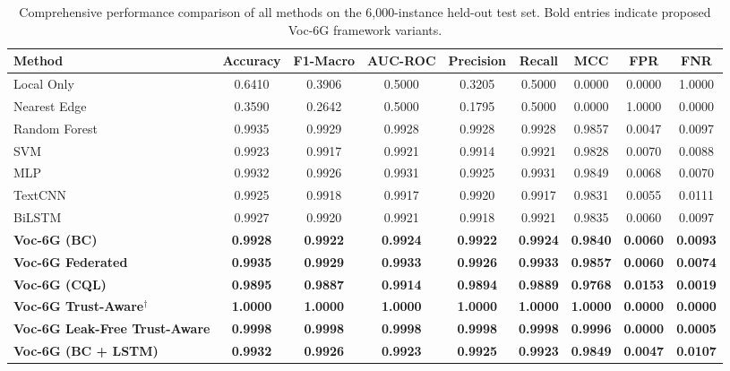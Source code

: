 \documentclass[journal,twoside]{IEEEtran}
\newcommand{\VocSixG}{Voc-6G}
\begin{document}
\begin{table}[t]
\caption{Comprehensive performance comparison of all methods on the 6,000-instance held-out test set. Bold entries indicate proposed \VocSixG{} framework variants.\footnotemark}
\label{tab:main_results}
\centering
\small
\begin{tabular}{lcccccccc}
\toprule
\textbf{Method} & \textbf{Accuracy} & \textbf{F1-Macro} & \textbf{AUC-ROC} & \textbf{Precision} & \textbf{Recall} & \textbf{MCC} & \textbf{FPR} & \textbf{FNR} \\
\midrule
Local Only       & 0.6410 & 0.3906 & 0.5000 & 0.3205 & 0.5000 & 0.0000 & 0.0000 & 1.0000 \\
Nearest Edge     & 0.3590 & 0.2642 & 0.5000 & 0.1795 & 0.5000 & 0.0000 & 1.0000 & 0.0000 \\
Random Forest    & 0.9935 & 0.9929 & 0.9928 & 0.9928 & 0.9928 & 0.9857 & 0.0047 & 0.0097 \\
SVM              & 0.9923 & 0.9917 & 0.9921 & 0.9914 & 0.9921 & 0.9828 & 0.0070 & 0.0088 \\
MLP              & 0.9932 & 0.9926 & 0.9931 & 0.9925 & 0.9931 & 0.9849 & 0.0068 & 0.0070 \\
TextCNN          & 0.9925 & 0.9918 & 0.9917 & 0.9920 & 0.9917 & 0.9831 & 0.0055 & 0.0111 \\
BiLSTM           & 0.9927 & 0.9920 & 0.9921 & 0.9918 & 0.9921 & 0.9835 & 0.0060 & 0.0097 \\
\midrule
\textbf{Voc-6G (BC)}              & \textbf{0.9928} & \textbf{0.9922} & \textbf{0.9924} & \textbf{0.9922} & \textbf{0.9924} & \textbf{0.9840} & \textbf{0.0060} & \textbf{0.0093} \\
\textbf{Voc-6G Federated}        & \textbf{0.9935} & \textbf{0.9929} & \textbf{0.9933} & \textbf{0.9926} & \textbf{0.9933} & \textbf{0.9857} & \textbf{0.0060} & \textbf{0.0074} \\
\textbf{Voc-6G (CQL)}            & \textbf{0.9895} & \textbf{0.9887} & \textbf{0.9914} & \textbf{0.9894} & \textbf{0.9889} & \textbf{0.9768} & \textbf{0.0153} & \textbf{0.0019} \\
\textbf{Voc-6G Trust-Aware}$^\dagger$ & \textbf{1.0000} & \textbf{1.0000} & \textbf{1.0000} & \textbf{1.0000} & \textbf{1.0000} & \textbf{1.0000} & \textbf{0.0000} & \textbf{0.0000} \\
\textbf{Voc-6G Leak-Free Trust-Aware} & \textbf{0.9998} & \textbf{0.9998} & \textbf{0.9998} & \textbf{0.9998} & \textbf{0.9998} & \textbf{0.9996} & \textbf{0.0000} & \textbf{0.0005} \\
\textbf{Voc-6G (BC + LSTM)}       & \textbf{0.9932} & \textbf{0.9926} & \textbf{0.9923} & \textbf{0.9925} & \textbf{0.9923} & \textbf{0.9849} & \textbf{0.0047} & \textbf{0.0107} \\
\bottomrule
\end{tabular}

\end{table}
\end{document}
